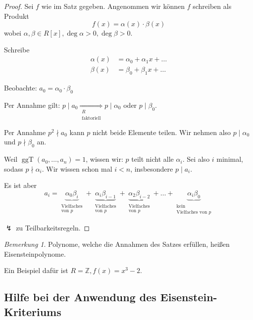 \documentclass[a4paper,12pt,numbers=noenddot,parskip=full]{scrartcl}
\newcommand{\setZ}{\mathbb{Z}}
\theoremstyle{dotless}
\theoremstyle{remark}
\newtheorem*{remark}{Bemerkung}
\begin{document}
	\begin{proof}
		Sei $f$ wie im Satz gegeben. Angenommen wir können $f$ schreiben als Produkt
		\begin{equation*}
		f(x) = \alpha(x) \cdot \beta(x)
		\end{equation*}
		wobei $\alpha, \beta \in R[x], \deg \alpha > 0, \deg \beta > 0$.
		
		Schreibe
		\begin{align*}
			\alpha(x) &= \alpha_0 + \alpha_1 x + \dots \\
			\beta(x) &= \beta_0 + \beta_1 x + \dots
		\end{align*}
		
		Beobachte: $a_0 = \alpha_0 \cdot \beta_0$
		
		Per Annahme gilt: $p \mid a_0 \underset{\substack{\text{$R$}\\\text{faktoriell}}}{\Rightarrow} p \mid \alpha_0$ oder $p \mid \beta_0$.
		
		Per Annahme $p^2 \nmid a_0$ kann $p$ nicht beide Elemente teilen. Wir nehmen also $p \mid \alpha_0$ und $p \nmid \beta_0$ an.
		
		Weil $\operatorname{ggT}(a_0, \dots, a_n) = 1$, wissen wir: $p$ teilt nicht alle $\alpha_i$. Sei also $i$ minimal, sodass $p \nmid \alpha_i$. Wir wissen schon mal $i < n$, insbesondere $p \mid a_i$.
		
		Es ist aber
		\begin{equation*}
			a_i = \underbrace{\alpha_0 \beta_i}_{\substack{\text{Vielfaches} \\ \text{von $p$}}} + \underbrace{\alpha_i \beta_{i-1}}_{\substack{\text{Vielfaches} \\ \text{von $p$}}} + \underbrace{\alpha_2 \beta_{i-2}}_{\substack{\text{Vielfaches} \\ \text{von $p$}}} + \dots + \underbrace{\alpha_i \beta_0}_{\substack{\text{kein} \\ \text{Vielfaches von $p$}}}
		\end{equation*}
		
		$\lightning$ zu Teilbarkeitsregeln.
	\end{proof}

	\begin{remark}
		Polynome, welche die Annahmen des Satzes erfüllen, heißen Eisensteinpolynome.
		
		Ein Beispiel dafür ist $R = \setZ, f(x) = x^3 - 2$.
	\end{remark}

	\subsection{Hilfe bei der Anwendung des Eisenstein-Kriteriums}
	
\end{document}
